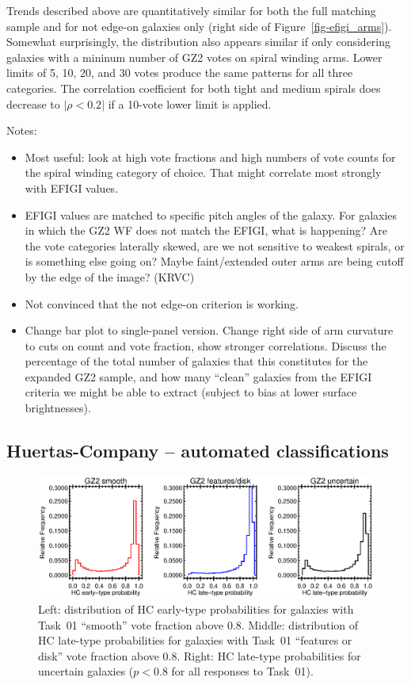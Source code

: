 \documentclass[useAMS,usenatbib]{mn2e}
\begin{document}
Trends described above are quantitatively similar for both the full matching sample and for not edge-on galaxies only (right side of Figure~\ref{fig-efigi_arms}). Somewhat surprisingly, the distribution also appears similar if only considering galaxies with a mininum number of GZ2 votes on spiral winding arms. Lower limits of 5, 10, 20, and 30 votes produce the same patterns for all three categories. The correlation coefficient for both tight and medium spirals does decrease to $|\rho<0.2|$ if a 10-vote lower limit is applied. 

Notes:
\begin{itemize}
\item Most useful: look at high vote fractions and high numbers of vote counts for the spiral winding category of choice. That might correlate most strongly with EFIGI values. 

\item EFIGI values are matched to specific pitch angles of the galaxy. For galaxies in which the GZ2 WF does not match the EFIGI, what is happening? Are the vote categories laterally skewed, are we not sensitive to weakest spirals, or is something else going on? Maybe faint/extended outer arms are being cutoff by the edge of the image? (KRVC)

\item Not convinced that the not edge-on criterion is working. 

\item Change bar plot to single-panel version. Change right side of arm curvature to cuts on count and vote fraction, show stronger correlations. Discuss the percentage of the total number of galaxies that this constitutes for the expanded GZ2 sample, and how many ``clean'' galaxies from the EFIGI criteria we might be able to extract (subject to bias at lower surface brightnesses).
\end{itemize}

\subsection{Huertas-Company -- automated classifications}

\begin{figure}
\includegraphics[angle=0,width=7.0in]{figures/hc_histogram.eps}
\caption{Left: distribution of HC early-type probabilities for galaxies with Task~01 ``smooth'' vote fraction above 0.8. Middle: distribution of HC late-type probabilities for galaxies with Task~01 ``features or disk'' vote fraction above 0.8. Right: HC late-type probabilities for uncertain galaxies ($p<0.8$ for all responses to Task~01). 
\label{fig-hc_histogram}}
\end{figure}
\end{document}
